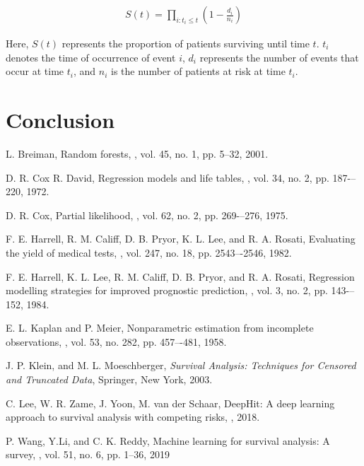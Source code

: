 \documentclass[conference]{IEEEconf}
\begin{document}
\begin{eqnarray}
S(t) = \prod_{i:t_i \leq t} \left(1 - \frac{d_i}{n_i}\right)
\end{eqnarray}

Here, $S(t)$ represents the proportion of patients surviving until time $t$. $t_i$ denotes the time of occurrence of event $i$, $d_i$ represents the number of events that occur at time $t_i$, and $n_i$ is the number of patients at risk at time $t_i$.

\section{Conclusion}






\begin{thebibliography}{1}


L. Breiman, Random forests, 
, vol. 45, no. 1, pp. 5--32, 2001.

D. R. Cox R. David, Regression models and life tables, 
, vol. 34, no. 2, pp. 187-–220, 1972.

D. R. Cox, Partial likelihood, 
, vol. 62, no. 2, pp. 269-–276, 1975.

F. E. Harrell, R. M. Califf, D. B. Pryor, K. L. Lee, and R. A. Rosati, Evaluating the yield of medical tests, 
, vol. 247, no. 18, pp. 2543–-2546, 1982. 

F. E. Harrell, K. L. Lee, R. M. Califf, D. B. Pryor, and R. A. Rosati, Regression modelling strategies for improved prognostic prediction, 
, vol. 3, no. 2, pp. 143-–152, 1984. 

E. L. Kaplan and P. Meier, Nonparametric estimation from incomplete observations, 
, vol. 53, no. 282, pp. 457–-481, 1958. 

J. P. Klein, and M. L. Moeschberger, 
{\it{Survival Analysis: Techniques for Censored and Truncated Data}}, Springer, New York, 2003. 

C. Lee, W. R. Zame, J. Yoon, M. van der Schaar, DeepHit: A deep learning approach to survival analysis with competing risks, 
, 2018. 

P. Wang, Y.Li, and C. K. Reddy, Machine learning for survival analysis: A survey, 
, vol. 51, no. 6, pp. 1--36, 2019

\end{thebibliography}
\end{document}

